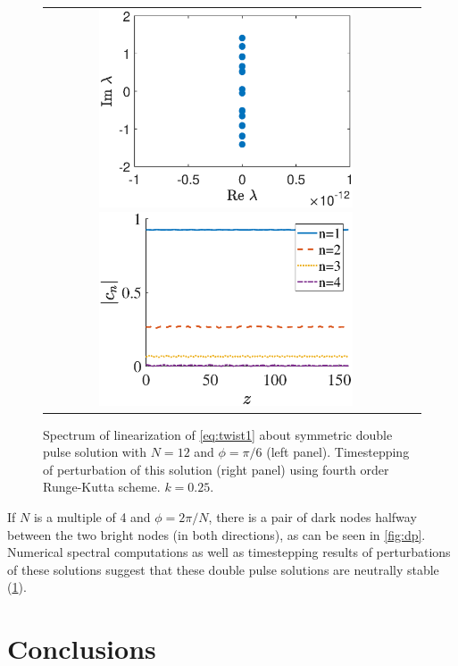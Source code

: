 \documentclass[12pt,reqno]{amsart}
\begin{document}
\begin{figure}[H]
\begin{center}
\begin{tabular}{cc}
\includegraphics[width=7.5cm]{dp12pi6spec.eps}
\includegraphics[width=7.5cm]{dp12pi6pert.eps}
\end{tabular}
\end{center}
\caption{Spectrum of linearization of \cref{eq:twist1} about symmetric double pulse solution with $N=12$ and $\phi = \pi/6$ (left panel). Timestepping of perturbation of this solution (right panel) using fourth order Runge-Kutta scheme. $k=0.25$.}
\label{fig:dpstab}
\end{figure}

If $N$ is a multiple of 4 and $\phi = 2\pi/N$, there is a pair of dark nodes halfway between the two bright nodes (in both directions), as can be seen in \cref{fig:dp}. Numerical spectral computations as well as timestepping results of perturbations of these solutions suggest that these double pulse solutions are neutrally stable (\cref{fig:dpstab}).

\section{Conclusions}
\end{document}
